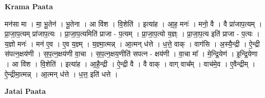 \documentclass[17pt]{extarticle}
\begin{document}
\textbf{Krama Paata} \newline

मन॑सा मा । मा॒ भू॒तेन॑ । भू॒तेना । आ वि॑श । वि॒शेति॑ । इत्या॑ह । आ॒ह॒ मनः॑ । मनो॒ वै । वै प्रा॑जाप॒त्यम् । प्रा॒जा॒प॒त्यम् प्रा॑जाप॒त्यः । प्रा॒जा॒प॒त्यमिति॑ प्राजा - प॒त्यम् । प्रा॒जा॒प॒त्यो य॒ज्ञ्ः । प्रा॒जा॒प॒त्य इति॑ प्राजा - प॒त्यः । य॒ज्ञो मनः॑ । मन॑ ए॒व । ए॒व य॒ज्ञ्म् । य॒ज्ञ्मा॒त्मन्न् । आ॒त्मन् ध॑त्ते । ध॒त्ते॒ वाक् । वाग॑सि । अ॒स्यै॒न्द्री । ऐ॒न्द्री स॑पत्न॒क्षय॑णी । स॒प॒त्न॒क्षय॑णी वा॒चा । स॒प॒त्न॒क्षय॒णीति॑ सपत्न - क्षय॑णी । वा॒चा मा᳚ । मे॒न्द्रि॒येण॑ । इ॒न्द्रि॒येणा । आ वि॑श । वि॒शेति॑ । इत्या॑ह । आ॒है॒न्द्री । ऐ॒न्द्री वै । वै वाक् । वाग् वाच᳚म् । वाच॑मे॒व । ए॒वैन्द्रीम् । ऐ॒न्द्रीमा॒त्मन्न् । आ॒त्मन् ध॑त्ते । ध॒त्त॒ इति॑ धत्ते । \newline

\textbf{Jatai Paata} \newline
\end{document}
